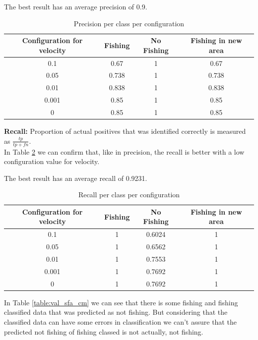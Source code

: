 The best result has an average precision of 0.9.


\begin {table}[H]
\begin{center}
\begin{tabular}{c|c|c|c}
Configuration for velocity & \textbf{Fishing} & \textbf{No Fishing}  & \textbf{Fishing in new area}  \\\hline
0.1 & 0.67 &  1  & 0.67 \\
0.05 & 0.738 & 1   & 0.738 \\
0.01 & 0.838   & 1 & 0.838 \\
0.001 & 0.85 & 1 & 0.85	\\
0 & 0.85 & 1 & 0.85	
\label{table:val_sfa_pr}
\end{tabular}
\caption {Precision per class per configuration}
\end{center}
\end {table}


\textbf{Recall:} Proportion of actual positives that was identified correctly is measured as \(\frac{tp}{tp+fn} \). \\
In Table \ref{table:val_sfa_re} we can confirm that, like in precision, the recall is better with a low configuration value for velocity.

The best result has an average recall of 0.9231.

\begin {table}[H]
\begin{center}
\begin{tabular}{c|c|c|c}
Configuration for velocity & \textbf{Fishing} & \textbf{No Fishing}  & \textbf{Fishing in new area}  \\\hline
0.1 & 1 &  0.6024  & 1  \\
0.05 & 1 & 0.6562   & 1 \\
0.01 & 1 & 0.7553 & 1 \\
0.001 &1 & 0.7692 & 1 \\
0 &1 & 0.7692 & 1
\label{table:val_sfa_re}
\end{tabular}
\caption {Recall per class per configuration}
\end{center}
\end {table}

In Table \ref{table:val_sfa_cm} we can see that there is some fishing and fishing classified data that was predicted as not fishing. But considering that the classified data can have some errors in classification we can't assure that the predicted not fishing of fishing classed is not actually, not fishing. 

